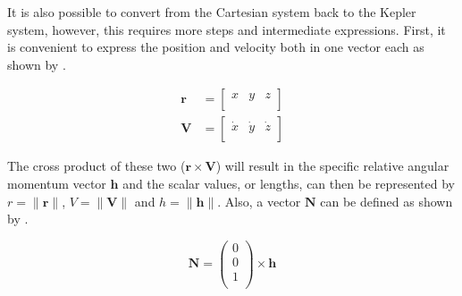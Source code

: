 

It is also possible to convert from the Cartesian system back to the Kepler system, however, this requires more steps and intermediate expressions. First, it is convenient to express the position and velocity both in one vector each as shown by .

\begin{equation}\label{eq:randvvectors}
\begin{split}
\mathbf{r}&=\begin{bmatrix}
x & y & z\\
\end{bmatrix}\\
\mathbf{V}&=\begin{bmatrix}
\dot{x} & \dot{y} & \dot{z}\\
\end{bmatrix}
\end{split}
\end{equation}

The cross product of these two ($\mathbf{r}\times\mathbf{V}$) will result in the specific relative angular momentum vector $\mathbf{h}$ and the scalar values, or lengths, can then be represented by $r=\|\mathbf{r}\|$, $V=\|\mathbf{V}\|$ and $h=\|\mathbf{h}\|$. Also, a vector $\mathbf{N}$ can be defined as shown by \cite{noomen2013basic}.

\begin{equation}\label{eq:N}
\mathbf{N}=\begin{pmatrix}
0\\
0\\
1\\
\end{pmatrix}
\times
\mathbf{h}
\end{equation}

